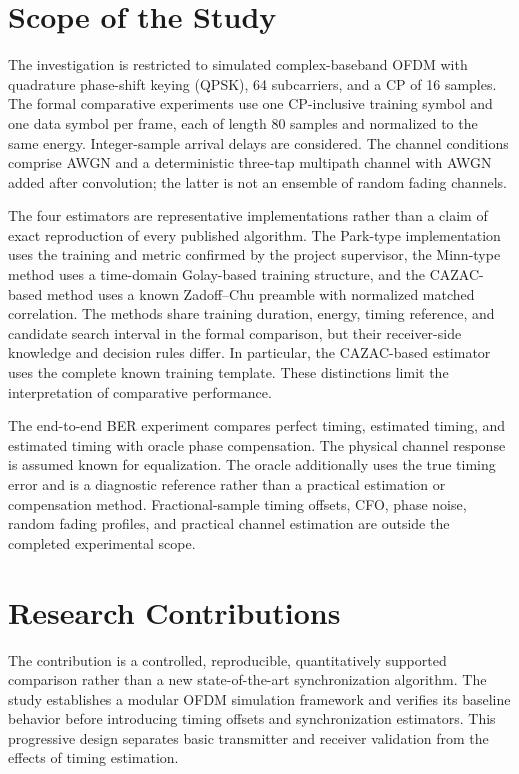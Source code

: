 \section{Scope of the Study}
The investigation is restricted to simulated complex-baseband OFDM with quadrature phase-shift keying (QPSK), 64 subcarriers, and a CP of 16 samples. The formal comparative experiments use one CP-inclusive training symbol and one data symbol per frame, each of length 80 samples and normalized to the same energy. Integer-sample arrival delays are considered. The channel conditions comprise AWGN and a deterministic three-tap multipath channel with AWGN added after convolution; the latter is not an ensemble of random fading channels.

The four estimators are representative implementations rather than a claim of exact reproduction of every published algorithm. The Park-type implementation uses the training and metric confirmed by the project supervisor, the Minn-type method uses a time-domain Golay-based training structure, and the CAZAC-based method uses a known Zadoff--Chu preamble with normalized matched correlation. The methods share training duration, energy, timing reference, and candidate search interval in the formal comparison, but their receiver-side knowledge and decision rules differ. In particular, the CAZAC-based estimator uses the complete known training template. These distinctions limit the interpretation of comparative performance.

The end-to-end BER experiment compares perfect timing, estimated timing, and estimated timing with oracle phase compensation. The physical channel response is assumed known for equalization. The oracle additionally uses the true timing error and is a diagnostic reference rather than a practical estimation or compensation method. Fractional-sample timing offsets, CFO, phase noise, random fading profiles, and practical channel estimation are outside the completed experimental scope.

\section{Research Contributions}
The contribution is a controlled, reproducible, quantitatively supported comparison rather than a new state-of-the-art synchronization algorithm. The study establishes a modular OFDM simulation framework and verifies its baseline behavior before introducing timing offsets and synchronization estimators. This progressive design separates basic transmitter and receiver validation from the effects of timing estimation.

